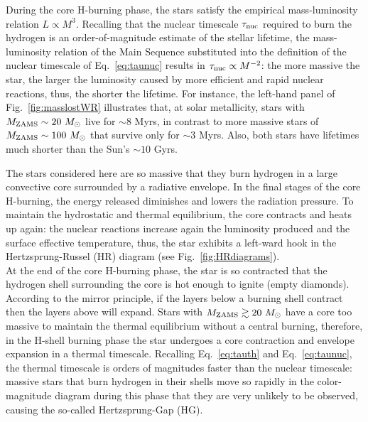 \documentclass[a4paper,titlepage]{book}     	%
\newcommand{\sun}{\ensuremath{_\odot}}
\newcommand{\mzams}{M_\textup{ZAMS}}
\newcommand{\msun}{\ensuremath{M\sun}}
\begin{document}
During the core H-burning phase, the stars satisfy the empirical mass-luminosity relation $L \propto M^3$. Recalling that the nuclear timescale $\tau_{\rm nuc}$ required to burn the hydrogen is an order-of-magnitude estimate of the stellar lifetime, the mass-luminosity relation of the Main Sequence substituted into the definition of the nuclear timescale of Eq.\ \ref{eq:taunuc} results in $\tau_{\rm nuc} \propto M^{-2}$: the more massive the star, the larger the luminosity caused by more efficient and rapid nuclear reactions, thus, the shorter the lifetime. For instance, the left-hand panel of Fig.\ \ref{fig:masslostWR} illustrates that, at solar metallicity, stars with $\mzams \sim 20~\msun$ live for $\sim 8$ Myrs, in contrast to more massive stars of $\mzams \sim 100~\msun$ that survive only for $\sim 3$ Myrs. Also, both stars have lifetimes much shorter than the Sun's $\sim 10$ Gyrs.

The stars considered here are so massive that they burn hydrogen in a large convective core surrounded by a radiative envelope. In the final stages of the core H-burning, the energy released diminishes and lowers the radiation pressure. To maintain the hydrostatic and thermal equilibrium, the core contracts and heats up again: the nuclear reactions increase again the luminosity produced and the surface effective temperature, thus, the star exhibits a left-ward hook in the Hertzsprung-Russel (HR) diagram (see Fig.\ \ref{fig:HRdiagrams}). \\

At the end of the core H-burning phase, the star is so contracted that the hydrogen shell surrounding the core is hot enough to ignite (empty diamonds). According to the mirror principle, if the layers below a burning shell contract then the layers above will expand. Stars with $\mzams \gtrsim 20~\msun$ have a core too massive to maintain the thermal equilibrium without a central burning, therefore, in the H-shell burning phase the star undergoes a core contraction and envelope expansion in a thermal timescale. Recalling Eq.\ \ref{eq:tauth} and Eq.\ \ref{eq:taunuc}, the thermal timescale is orders of magnitudes faster than the nuclear timescale: massive stars that burn hydrogen in their shells move so rapidly in the color-magnitude diagram during this phase that they are very unlikely to be observed, causing the so-called Hertzsprung-Gap (HG). \\
\end{document}
